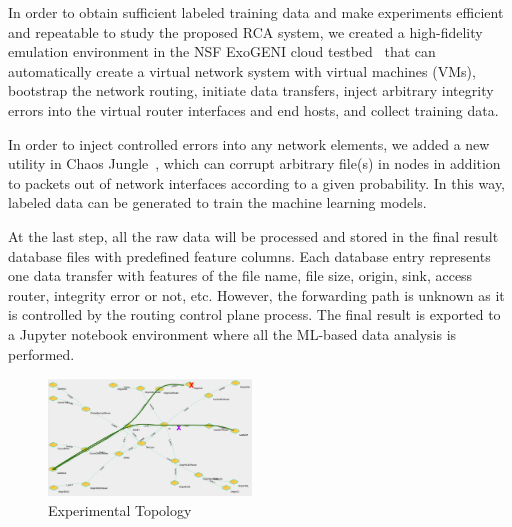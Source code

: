 In order to obtain sufficient labeled training data and make experiments efficient and repeatable to study the proposed RCA system, 
we created a high-fidelity emulation environment in the NSF ExoGENI cloud testbed~\cite{ExoGENI:web} that can automatically create a virtual network system with virtual machines (VMs), bootstrap the network routing, 
initiate data transfers, inject arbitrary integrity errors into the virtual router interfaces and end hosts, and collect training data.

In order to inject controlled errors into any network elements, we added a new utility in Chaos Jungle~\cite{swip:pearc:2019,chaosjungle:web}, which can corrupt arbitrary file(s) in nodes in addition to packets out of network interfaces according to a given probability. In this way, labeled data can be generated to train the machine learning models. 

At the last step, all the raw data will be processed and stored in the final result database files with predefined feature columns. Each database entry represents one data transfer with features of the file name, file size, origin, sink, access router, integrity error or not, etc. However, the forwarding path is unknown as it is controlled by the routing control plane process. The final result is exported to a Jupyter notebook environment where all the ML-based data analysis is performed.


\begin{figure}[!ht]
\begin{center}
\includegraphics[width=0.48\textwidth]{./figure/ChaosJungle}
\end{center}
\caption{Experimental Topology}
\label{fig:topology}
\end{figure}

